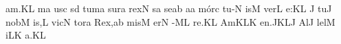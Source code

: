 \sgn {}a{m.}\punctum K\augmentum L\egn
\spatium
\divisiofinalis
\spatium
{}m\punctum a\egn
\sgn {}us\punctum c\egn
\spatium
{}s\punctum d\egn
\sgn tum\punctum a\egn
\spatium
\sgn sur\punctum a\egn
\sgn rex\punctum N\egn
\sgn {}{\'\i}s\punctum a\egn
\sgn se{}\punctum a\augmentum b\egn
\spatium
\divisiominima
\spatium
\sgn {}a{}\punctum a\egn
\spatium
\sgn m{\'o}r\punctum c\egn
\sgn tu-\punctum N\egn
\sgn {}is\punctum M\egn
\spatium
\sgn ver\punctum L\egn
\sgn {}e:\punctum K\augmentum L\egn
\spatium
\divisiominor
\spatium
\custos J
\lineaproxima
\sgn tu{}\punctum J\egn
\spatium
\sgn n{o}b\punctum M\egn
\sgn {}i{s,}\punctum L\egn
\spatium
\sgn v{i}c\punctum N\egn
\sgn tor\punctum a\egn
\spatium
\sgn Re{x,}\punctum a\augmentum b\egn
\spatium
\divisiominima
\spatium
\sgn mis\punctum M\egn
\sgn {}er\punctum N\egn
{}-\clivis ML\egn
\sgn re.\punctum K\augmentum L\egn
\spatium
\divisiofinalis
\spatium
\sgn {}Am\torculus KLK\egn
\sgn {}e{n.}\pes JK\augmentumduplex LJ\egn
\spatium
\divisiominima
\spatium
\sgn {}Al\punctum J\egn
\sgn lel\punctum M\egn
{}i\cephalicus LK\egn
\sgn {}a.\punctum K\augmentum L\egn
\spatium
\Finisgregoriana

\bigskip

